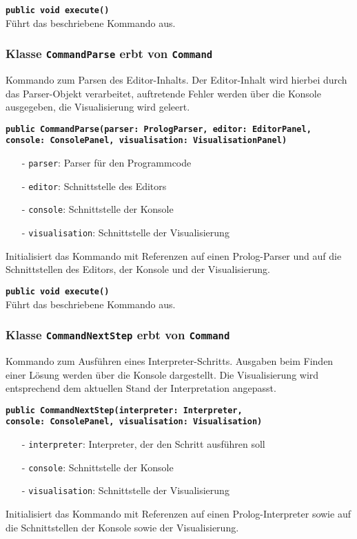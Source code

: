 \documentclass[parskip=full,11pt,twoside]{scrartcl}
\begin{document}
\textbf{\texttt{public void execute()}}\\
Führt das beschriebene Kommando aus.

\subsubsection{Klasse \texttt{CommandParse} erbt von \texttt{Command}}
Kommando zum Parsen des Editor-Inhalts. Der Editor-Inhalt wird hierbei durch das Parser-Objekt verarbeitet, auftretende Fehler werden über die Konsole ausgegeben, die Visualisierung wird geleert.

\textbf{\texttt{public CommandParse(parser: PrologParser, editor: EditorPanel,\\console: ConsolePanel, visualisation: VisualisationPanel)}}\\
\begin{itemize}[noitemsep]
	\item[-] \texttt{parser}: Parser für den Programmcode
	\item[-] \texttt{editor}: Schnittstelle des Editors
	\item[-] \texttt{console}: Schnittstelle der Konsole
	\item[-] \texttt{visualisation}: Schnittstelle der Visualisierung
\end{itemize}
Initialisiert das Kommando mit Referenzen auf einen Prolog-Parser und auf die Schnittstellen des Editors, der Konsole und der Visualisierung.

\textbf{\texttt{public void execute()}}\\
Führt das beschriebene Kommando aus.

\subsubsection{Klasse \texttt{CommandNextStep} erbt von \texttt{Command}}
Kommando zum Ausführen eines Interpreter-Schritts. Ausgaben beim Finden einer Lösung werden über die Konsole dargestellt. Die Visualisierung wird entsprechend dem aktuellen Stand der Interpretation angepasst.

\textbf{\texttt{public CommandNextStep(interpreter: Interpreter,\\console: ConsolePanel, visualisation: Visualisation)}}\\
\begin{itemize}[noitemsep]
	\item[-] \texttt{interpreter}: Interpreter, der den Schritt ausführen soll
	\item[-] \texttt{console}: Schnittstelle der Konsole
	\item[-] \texttt{visualisation}: Schnittstelle der Visualisierung
\end{itemize}
Initialisiert das Kommando mit Referenzen auf einen Prolog-Interpreter sowie auf die Schnittstellen der Konsole sowie der Visualisierung.
\end{document}
